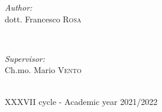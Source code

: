 \begin{titlepage}
\begin{minipage}{0.4\textwidth}
\begin{flushleft} \large
\emph{Author:} \\
dott. Francesco \textsc{Rosa} \newline
\end{flushleft}
\end{minipage}
~
\begin{minipage}{0.37\textwidth}
\begin{flushright} \large
\emph{Supervisor:} \\
\hfill Ch.mo. Mario \textsc{Vento}\newline
\end{flushright}
\end{minipage}\\[1.5cm]



{\large XXXVII cycle - Academic year 2021/2022}\\[1cm] %

 

\vfill %
\end{titlepage}